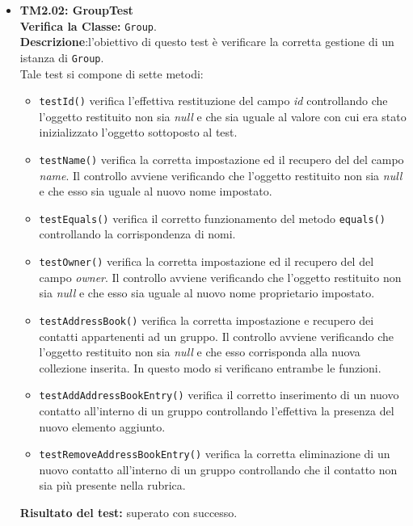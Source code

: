 \begin{itemize}
\item \textbf{TM2.02: GroupTest}\\
\textbf{Verifica la Classe:} \texttt{Group}.\\
\textbf{Descrizione}:l'obiettivo di questo test è verificare la corretta gestione di un istanza di \texttt{Group}.\\
Tale test si compone di sette metodi:
\begin{itemize}

\item \texttt{testId()} verifica l'effettiva restituzione del campo \textit{id} controllando che l'oggetto restituito non sia \textit{null} e che sia uguale al valore con cui era stato inizializzato l'oggetto sottoposto al test.

\item \texttt{testName()}
verifica la corretta impostazione ed il recupero del del campo \textit{name}. Il controllo avviene verificando che l'oggetto restituito non sia \textit{null} e che esso sia uguale al nuovo nome impostato. 

\item \texttt{testEquals()} 
verifica il corretto funzionamento del metodo \texttt{equals()} controllando la corrispondenza di nomi. 

\item \texttt{testOwner()} verifica la corretta impostazione ed il recupero del del campo \textit{owner}. Il controllo avviene verificando che l'oggetto restituito non sia \textit{null} e che esso sia uguale al nuovo nome proprietario impostato. 

\item \texttt{testAddressBook()} verifica la corretta impostazione e recupero dei contatti appartenenti ad un gruppo.
Il controllo avviene verificando che l'oggetto restituito non sia \textit{null} e che esso corrisponda alla nuova collezione inserita.
In questo modo si verificano entrambe le funzioni.

\item \texttt{testAddAddressBookEntry()} verifica il corretto inserimento di un nuovo contatto all'interno di un gruppo controllando l'effettiva la presenza del nuovo elemento aggiunto.

\item \texttt{testRemoveAddressBookEntry()}  
verifica la corretta eliminazione di un nuovo contatto all'interno di un gruppo controllando che il contatto non sia più presente nella rubrica.

\end{itemize}
\textbf{Risultato del test:} superato con successo.


\end{itemize}
